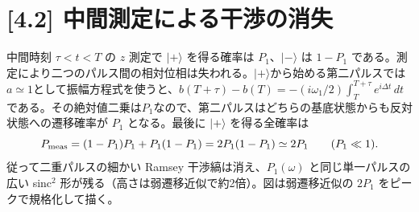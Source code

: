 \documentclass[11pt,a4paper]{article}
\begin{document}
\section*{[4.2] 中間測定による干渉の消失}
中間時刻 $\tau<t<T$ の $z$ 測定で $|+\rangle$ を得る確率は $P_1$、$|-\rangle$ は $1-P_1$ である。測定により二つのパルス間の相対位相は失われる。$|+\rangle$から始める第二パルスでは$a\simeq1$として振幅方程式を使うと、$b(T+\tau)-b(T)=-(i\omega_1/2)\int_T^{T+\tau}e^{i\Delta t}\,dt$である。その絶対値二乗は$P_1$なので、第二パルスはどちらの基底状態からも反対状態への遷移確率が $P_1$ となる。最後に $|+\rangle$ を得る全確率は
\[
P_{\rm meas}=(1-P_1)P_1+P_1(1-P_1)=2P_1(1-P_1)
\simeq2P_1\qquad(P_1\ll1).
\]
従って二重パルスの細かい Ramsey 干渉縞は消え、$P_1(\omega)$ と同じ単一パルスの広い sinc$^2$ 形が残る（高さは弱遷移近似で約2倍）。図は弱遷移近似の $2P_1$ をピークで規格化して描く。
\begin{center}
\end{center}
\end{document}
